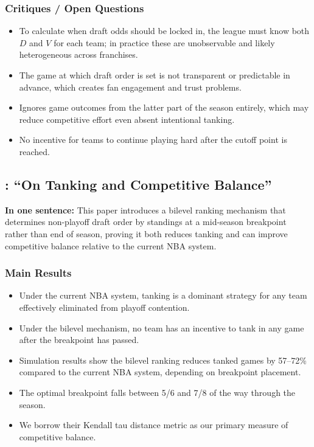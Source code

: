 \documentclass{article}
\begin{document}
\subsubsection*{Critiques / Open Questions}
\begin{itemize}
    \item To calculate when draft odds should be locked in, the league must
    know both $D$ and $V$ for each team; in practice these are unobservable
    and likely heterogeneous across franchises.
    \item The game at which draft order is set is not transparent or
    predictable in advance, which creates fan engagement and trust problems.
    \item Ignores game outcomes from the latter part of the season entirely,
    which may reduce competitive effort even absent intentional tanking.
    \item No incentive for teams to continue playing hard after the cutoff
    point is reached.
\end{itemize}

\subsection{\citet{kazachkov2020}: ``On Tanking and Competitive Balance''}

\textbf{In one sentence:} This paper introduces a bilevel ranking mechanism
that determines non-playoff draft order by standings at a mid-season
breakpoint rather than end of season, proving it both reduces tanking and can
improve competitive balance relative to the current NBA system.

\subsubsection*{Main Results}
\begin{itemize}
    \item Under the current NBA system, tanking is a dominant strategy for
    any team effectively eliminated from playoff contention.
    \item Under the bilevel mechanism, no team has an incentive to tank in any
    game after the breakpoint has passed.
    \item Simulation results show the bilevel ranking reduces tanked games by
    57--72\% compared to the current NBA system, depending on breakpoint
    placement.
    \item The optimal breakpoint falls between 5/6 and 7/8 of the way through
    the season.
    \item We borrow their Kendall tau distance metric as our primary measure
    of competitive balance.
\end{itemize}
\end{document}
